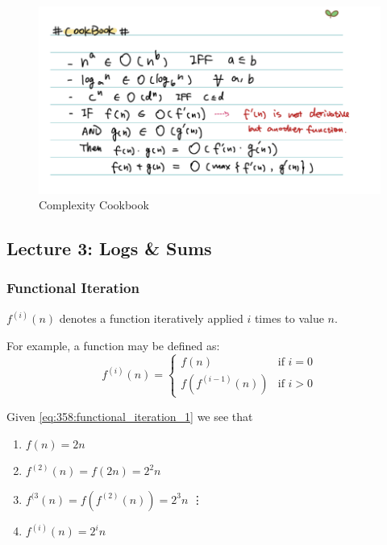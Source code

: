 \documentclass[10pt]{article}
\begin{document}
\begin{figure}[H]
	\centering
	\includegraphics[width=0.8\linewidth]{img/image_2022-09-13-00-26-01.png}
	\caption{Complexity Cookbook}
	\label{fig:358:complexity_cookbook}
\end{figure}

\subsection{Lecture 3: Logs \& Sums}



\subsubsection{Functional Iteration}

$ f^{(i)}(n) $  denotes a function iteratively applied $ i $ times to value $ n $.

For example, a function may be defined as:
\begin{equation}
	f^{(i)}(n) = 
	\begin{cases}
		f(n) & \text{if } i = 0 \\
		f(f^{(i-1)}(n)) & \text{if } i > 0
	\end{cases}
	\label{eq:358:functional_iteration_1}
\end{equation}


Given \eqref{eq:358:functional_iteration_1} we see that 

\begin{enumerate}
	\item $ f(n) = 2n $ 
	\item $ f^{(2)}(n) = f(2n) = 2^2n$ 
	\item $ f^{(3}(n) = f(f^{(2)}(n)) = 2^3n$ 
	\vdots
	\item $ f^{(i)}(n) = 2^in $
\end{enumerate}
\end{document}
